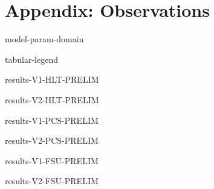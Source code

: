 \hypertarget{apx:Observations}{%
\chapter{Appendix: Observations}\label{apx:Observations}}


\newcommand{\ObservationTable}[2]{%
\begin{table}[h!]
  \centering
  \label{tab:V#1-#2}
  \caption{Observations for $\CGKAmod{\VersionOne}{T}{N} \models \LTLPredicate{#2}$.}
  {results-V#1-#2-PRELIM}
\end{table}
}

\begin{table}[h!]
  \centering
  \label{tab:model-param-domain}
  \caption{Verification domain of \( \CGKAmod{P}{T}{N} \models \varphi \) parameters.}
  {model-param-domain}
\end{table}

\begin{table}[h!]
  \centering
  \label{tab:table-legend}
  \caption{Legend of symbols appearing in tables}
  {tabular-legend}
\end{table}

\ObservationTable{1}{HLT}
\ObservationTable{2}{HLT}
\ObservationTable{1}{PCS}
\ObservationTable{2}{PCS}
\ObservationTable{1}{FSU}
\ObservationTable{2}{FSU}
